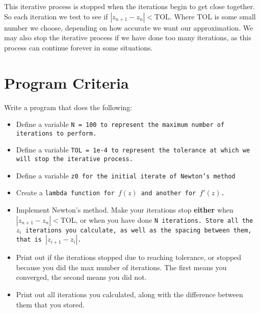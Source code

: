 \documentclass{article}
\def\prog#1{
\vspace{.1in}\begin{mdframed} \begin{center} \textbf{Programming Reminders} \end{center}#1 \end{mdframed} }
\begin{document}
	This iterative process is stopped when the iterations begin to get close together.  So each iteration we test to see if $|z_{n+1} - z_n| < \text{TOL}$.  Where TOL is some small number we choose, depending on how accurate we want our approximation.  We may also stop the iterative process if we have done too many iterations, as this process can continue forever in some situations.
	
	
 
 	
 	
 	
 	
 	
 	
 	

	
	
	
	
	
	
	
	




\section*{Program Criteria}
	Write a program that does the following:
	\begin{itemize}
		\item Define a variable \tt{N = 100} to represent the maximum number of iterations to perform.  
		\item Define a variable \tt{TOL = 1e-4} to represent the tolerance at which we will stop the iterative process.
		\item Define a variable \tt{z0} for the initial iterate of Newton's method
		\item Create a \tt{lambda} function for $f(z)$ and another for $f'(z)$.
		\item Implement Newton's method.  Make your iterations stop \textbf{either} when $|z_{n+1} - z_n| < $TOL, or when you have done \tt{N} iterations.  Store all the $z_i$ iterations you calculate, as well as the spacing between them, that is $|z_{i+1} - z_i|$.
		\item Print out if the iterations stopped due to reaching tolerance, or stopped because you did the max number of iterations.  The first means you converged, the second means you did not.
		\item Print out all iterations you calculated, along with the difference between them that you stored.
	\end{itemize}
\end{document}
